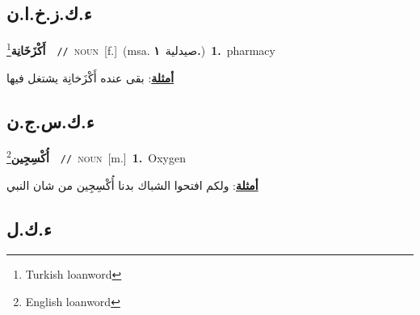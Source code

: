 \documentclass[10pt,a4paper,twoside]{article} %
\begin{document}
\begin{multicols}{2}
\vspace{-3mm}
\subsection*{\color{blue}\foreignlanguage{arabic}{ء.ك.ز.خ.ا.ن}\color{blue}{ (ntws)}} 

{\setlength\topsep{0pt}\textbf{\foreignlanguage{arabic}{أَكْزَخَانِة}}\footnote{Turkish loanword}\ \ {\color{gray}\texttt{//}\color{black}}\ \textsc{noun}\ [f.]\ \color{gray}(msa. \foreignlanguage{arabic}{صيدلية}~\foreignlanguage{arabic}{\textbf{١.}})\color{black}\ \textbf{1.}~pharmacy\  \begin{flushright}\color{gray}\foreignlanguage{arabic}{\textbf{\underline{\foreignlanguage{arabic}{أمثلة}}}: بقى عنده أَكْزَخانِة يشتغل فيها}\end{flushright}\color{black}} \vspace{2mm}

\vspace{-3mm}
\subsection*{\color{blue}\foreignlanguage{arabic}{ء.ك.س.ج.ن}\color{blue}{ (ntws)}} 

{\setlength\topsep{0pt}\textbf{\foreignlanguage{arabic}{أُكْسِجِين}}\footnote{English loanword}\ \ {\color{gray}\texttt{//}\color{black}}\ \textsc{noun}\ [m.]\ \textbf{1.}~Oxygen\  \begin{flushright}\color{gray}\foreignlanguage{arabic}{\textbf{\underline{\foreignlanguage{arabic}{أمثلة}}}: ولكم افتحوا الشباك بدنا أُكْسِجِين من شان النبي}\end{flushright}\color{black}} \vspace{2mm}

\vspace{-3mm}
\subsection*{\color{blue}\foreignlanguage{arabic}{ء.ك.ل}\color{blue}{}} 


\end{multicols}
\end{document}

